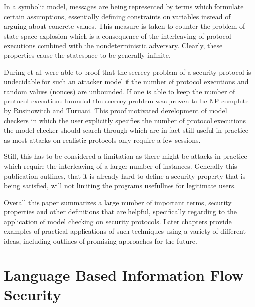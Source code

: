 \documentclass[a4paper,UKenglish]{lipics-v2018}
\begin{document}
In a symbolic model, messages are being represented by terms which formulate certain assumptions, essentially defining constraints on variables instead of arguing about concrete values. This measure is taken to counter the problem of state space explosion which is a consequence of the interleaving of protocol executions combined with the nondeterministic adversary. Clearly, these properties cause the statespace to be generally infinite.\cite{model_checking_security_protocols}

During et al. were able to proof that the secrecy problem of a security protocol is undecidable for such an attacker model if the number of protocol executions and random values (nonces) are unbounded.\cite{DLMS99} If one is able to keep the number of protocol executions bounded the secrecy problem was proven to be NP-complete by Rusinowitch and Turuani.\cite{RT01} This proof motivated development of model checkers in which the user explicitly specifies the number of protocol executions the model checker should search through which are in fact still useful in practice as most attacks on realistic protocols only require a few sessions.\cite{model_checking_security_protocols}

Still, this has to be considered a limitation as there might be attacks in practice which require the interleaving of a larger number of instances. Generally this publication outlines, that it is already hard to define a security property that is being satisfied, will not limiting the programs usefullnes for legitimate users.

Overall this paper summarizes a large number of important terms, security properties and other definitions that are helpful, specifically regarding to the application of model checking on security protocols. Later chapters provide examples of practical applications of such techniques using a variety of different ideas, including outlines of promising approaches for the future.






\newpage
\section{Language Based Information Flow Security}
\end{document}
